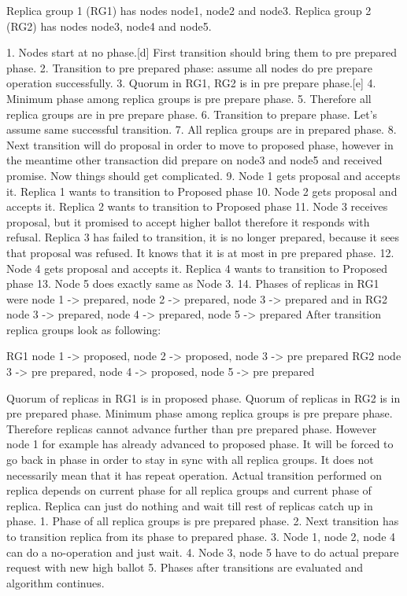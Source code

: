 Replica group 1 (RG1) has nodes node1, node2 and node3. 
Replica group 2 (RG2) has nodes node3, node4 and node5.


1. Nodes start at no phase.[d] First transition should bring them to pre prepared phase.
2. Transition to pre prepared phase: assume all nodes do pre prepare operation successfully.
3. Quorum in RG1, RG2 is in pre prepare phase.[e]
4. Minimum phase among replica groups is pre prepare phase.
5. Therefore all replica groups are in pre prepare phase.
6. Transition to prepare phase. Let’s assume same successful transition.
7. All replica groups are in prepared phase.
8. Next transition will do proposal in order to move to proposed phase, however in the meantime other transaction did prepare on node3 and node5 and received promise. Now things should get complicated. 
9. Node 1 gets proposal and accepts it. Replica 1 wants to transition to Proposed phase
10. Node 2 gets proposal and accepts it. Replica 2 wants to transition to Proposed phase
11. Node 3 receives proposal, but it promised to accept higher ballot therefore it responds with refusal. Replica 3 has failed to transition, it is no longer prepared, because it sees that proposal was refused. It knows that it is at most in pre prepared phase. 
12. Node 4 gets proposal and accepts it. Replica 4 wants to transition to Proposed phase
13. Node 5 does exactly same as Node 3.
14. Phases of replicas in RG1 were { node 1 -> prepared, node 2 -> prepared, node 3 -> prepared } and in RG2 { node 3 -> prepared, node 4 -> prepared, node 5 -> prepared }
        After transition replica groups look as following:


RG1 { node 1 -> proposed, node 2 -> proposed, node 3 -> pre prepared }
RG2 { node 3 -> pre prepared, node 4 -> proposed, node 5 -> pre prepared }


Quorum of replicas in RG1 is in proposed phase.
Quorum of replicas in RG2 is in pre prepared phase.
Minimum phase among replica groups is pre prepare phase.
        Therefore replicas cannot advance further than pre prepared phase. However node 1 for example has already advanced to proposed phase. It will be forced to go back in phase in order to stay in sync with all replica groups. It does not necessarily mean that it has repeat operation. Actual transition performed on replica depends on current phase for all replica groups and current phase of replica. Replica can just do nothing and wait till rest of replicas catch up in phase.
1. Phase of all replica groups is pre prepared phase.
2. Next transition has to transition replica from its phase to prepared phase.
3. Node 1, node 2, node 4 can do a no-operation and just wait.
4. Node 3, node 5 have to do actual prepare request with new high ballot
5. Phases after transitions are evaluated and algorithm continues.
        
